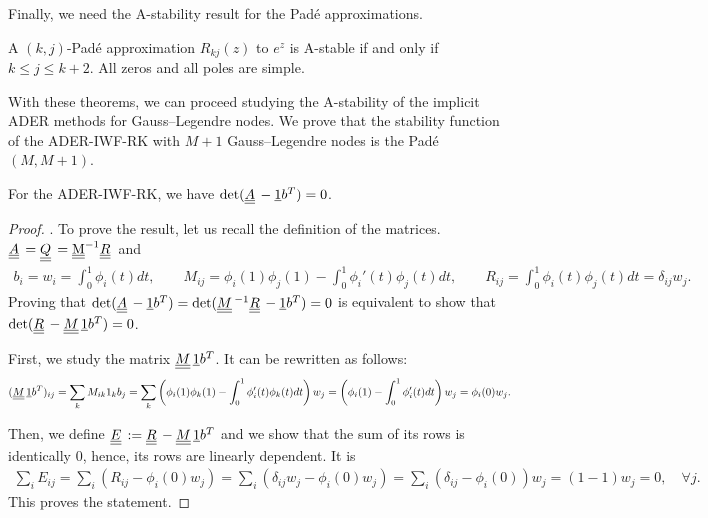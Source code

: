 Finally, we need the A-stability result for the Pad\'e approximations.
\begin{theorem}\label{th:pade_A_stab}
	A $(k,j)$-Pad\'e approximation $R_{kj}(z)$ to $e^z$ is A-stable if and only if $k\leq j \leq k+2$. All zeros and all poles are simple.
\end{theorem}


With these theorems, we can proceed studying the A-stability of the implicit ADER methods for Gauss--Legendre nodes.
We  prove that the stability function of the ADER-IWF-RK with $M+1$ Gauss--Legendre nodes is the Pad\'e$(M,M+1)$.
\begin{proposition}\label{prop:zero_det}
	For the ADER-IWF-RK, we have $\det(\mat{A}-\vec{1}b^T)=0$.
\end{proposition}
\begin{proof}
	. %
	To prove the result, let us recall the definition of the matrices. $\mat{A}=\mat{Q} = \M^{-1} \mat{R} $ and
	\begin{align*}
	b_i = w_i = \int_0^1 \phi_i(t)dt, \qquad  M_{ij} = \phi_i(1)\phi_j(1) - \int_0^1 \phi_i'(t)\phi_j(t) dt, \qquad R_{ij} = \int_0^1 \phi_i(t) \phi_j(t) dt = \delta_{ij} w_j.
	\end{align*} 
	Proving that $\det(\mat{A}-\vec{1}b^T)=\det(\mat{M}^{-1}\mat{R}-\vec{1}b^T)=0$ is equivalent to show that $\det(\mat{R}-\mat{M}\vec{1}b^T)=0$. 
	
	First, we study the matrix $\mat{M}\vec{1}b^T$. It can be rewritten as follows:
	\begin{align*}
	(\mat{M}\vec{1}b^T)_{ij}  = \sum_k M_{ik} 1_k b_j = \sum_k \left(\phi_i(1)\phi_k(1) - \int_0^1 \phi_i'(t)\phi_k(t) dt \right) w_j = \left(\phi_i(1) - \int_0^1 \phi_i'(t)dt \right) w_j = \phi_i(0) w_j.
	\end{align*}
	
	Then, we define $\mat{E}:=\mat{R}-\mat{M}\vec{1}b^T$ and we show that the sum of its rows is identically 0, hence, its rows are linearly dependent. It is
	\begin{align}
	\sum_{i} E_{ij} = \sum_{i} \left(R_{ij}-\phi_i(0) w_j\right) =  \sum_{i} \left(\delta_{ij} w_j-\phi_i(0) w_j\right) =  \sum_{i} \left(\delta_{ij}-\phi_i(0) \right) w_j  = (1-1)w_j = 0, \quad \forall j.
	\end{align} 
	This proves the statement.
\end{proof}

